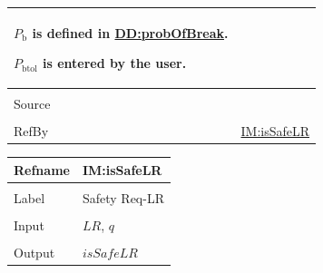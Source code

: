 \documentclass[12pt]{article}
\begin{document}
\begin{minipage}{\textwidth}
\begin{tabular}{>{\raggedright}p{}>{\raggedright\arraybackslash}p{}}
        ${P_{\text{b}}}$ is defined in \hyperref[DD:probOfBreak]{DD:probOfBreak}.
        
        ${P_{\text{b}\text{tol}}}$ is entered by the user.
        
\\ \midrule \\
Source & \cite{astm2009}
         
\\ \midrule \\
RefBy & \hyperref[IM:isSafeLR]{IM:isSafeLR}
        
\\ \bottomrule
\end{tabular}
\end{minipage}
\vspace{\baselineskip}
\noindent
\begin{minipage}{\textwidth}
\begin{tabular}{>{\raggedright}p{}>{\raggedright\arraybackslash}p{}}
\toprule \textbf{Refname} & \textbf{IM:isSafeLR}
\label{IM:isSafeLR}
\\ \midrule \\
Label & Safety Req-LR
        
\\ \midrule \\
Input & $\mathit{LR}$, $q$
        
\\ \midrule \\
Output & $\mathit{isSafeLR}$
         

\end{tabular}
\end{minipage}
\end{document}
